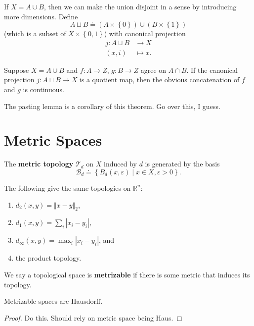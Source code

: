 \documentclass[twoside,10pt]{report}
\begin{document}
If $X = A \cup B$, then we can make the union disjoint in a sense by introducing more dimensions. Define
\[
	A \sqcup B \doteq (A \times \left\{ 0 \right\}) \cup (B \times \left\{ 1 \right\})
\] (which is a subset of $X \times \left\{ 0,1 \right\}$) with canonical projection
\begin{align*}
	j: A \sqcup B &\to X \\
	(x,i)&\mapsto x.
\end{align*}

\begin{thrm}
	Suppose $X = A \cup B$ and $f:A\to Z$, $g:B\to Z$ agree on $A \cap B$. If the canonical projection $j: A \sqcup B \to X$ is a quotient map, then the obvious concatenation of $f$ and $g$ is continuous.
\end{thrm}

The pasting lemma is a corollary of this theorem. {\color{red}Go over this, I guess.}


\section{Metric Spaces}

\begin{defn}[]
The \textbf{metric topology} $\mathcal{T}_{d}$ on $X$ induced by $d$ is generated by the basis
\[
	\mathcal{B}_{d} \doteq \left\{ B_{d}(x,\varepsilon) \;|\; x \in X, \varepsilon>0 \right\}.
\] 
\end{defn}

\begin{prop}
The following give the same topologies on $\mathbb{R}^n$:
\begin{enumerate}
	\item $d_2(x,y) = {\Vert{x-y}\Vert}_{2}$,
	\item $d_1(x,y)=\sum_i |x_i-y_i|$,
	\item $d_{\infty}(x,y) = \max_{i}|x_i-y_i|$, and
	\item the product topology.
\end{enumerate}
\end{prop}

We say a topological space is \textbf{metrizable} if there is some metric that induces its topology.

\begin{prop}
Metrizable spaces are Hausdorff.
\end{prop}
\begin{proof}
	{\color{red}Do this. Should rely on metric space being Haus.}
\end{proof}
\end{document}
